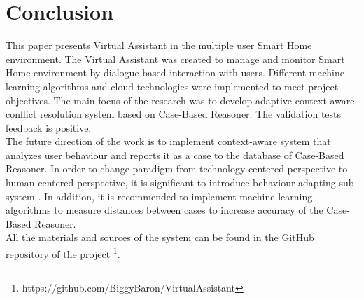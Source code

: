 \documentclass{llncs}
\begin{document}
    \section{Conclusion}
    This paper presents Virtual Assistant in the multiple user Smart Home environment.
    The Virtual Assistant was created
    to manage and monitor Smart Home environment by dialogue based interaction with users.
    Different machine learning
    algorithms and cloud technologies were implemented to meet project objectives.
    The main focus of the research was to
    develop adaptive context aware conflict resolution system based on Case-Based Reasoner.
    The validation tests feedback is positive.\\
    The future direction of the work is to implement context-aware system that analyzes user behaviour and reports it as
    a case to the database of Case-Based Reasoner.
    In order to change paradigm from technology centered perspective to human centered perspective,
    it is significant to introduce behaviour adapting sub-system \cite{2}.
    In addition, it is recommended to implement machine learning algorithms to measure distances between cases to
    increase accuracy of the Case-Based Reasoner.\\
    All the materials and sources of the system can be found in the GitHub repository of the project \footnote{https://github.com/BiggyBaron/VirtualAssistant}.
\end{document}
